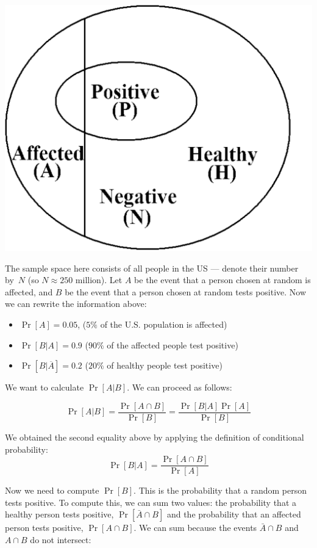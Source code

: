 \documentclass[11pt]{article}
\begin{document}
\includegraphics[bb = -400 0 0 520, scale = 0.22]{pharmacy.pdf}

The sample space here
consists of all people in the US --- denote their number by~$N$
(so $N\approx 250$ million). Let $A$ be the event that a person chosen
at random is affected, and $B$ be the event that a person chosen at random
tests positive. Now we can rewrite the information above:
\begin{itemize}

\item $\Pr [A] = 0.05$, ($5\%$ of the U.S. population is affected)

\item $\Pr [B|A] = 0.9$ ($90\%$ of the affected people test positive)

\item $\Pr [B|\overline{A}] =0.2$ ($20\%$ of healthy people test positive)

\end{itemize}

We want to calculate $\Pr [A|B]$. We can proceed as follows:

\begin{equation}
\label{eq:bayes}
 \Pr [A|B] = \frac{\Pr [A\cap B]}{\Pr [B]} = \frac{\Pr [B|A]\Pr [A]}{\Pr [B]}
 \end{equation}

 We obtained the second equality above by applying the definition 
 of conditional probability:
 $$
 \Pr[B|A] = \frac{\Pr[A\cap B]}{\Pr[A]}
 $$
 
 Now we need to compute $\Pr[B]$. This is the probability that
 a random person tests positive. To compute this, we can sum two values:
 the probability that a healthy person tests positive, $\Pr[\bar{A}\cap B]$ and the
 probability that an affected person tests positive, $\Pr[A\cap B]$. We can sum because
 the events $\bar{A}\cap B$ and $A\cap B$ do not intersect:
 
\end{document}
